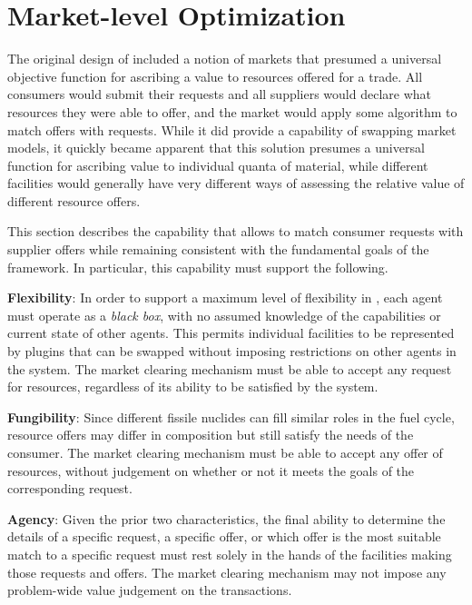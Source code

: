\section{Market-level Optimization}\label{section:market}

The original design of \Cyclus included a notion of markets that presumed a
universal objective function for ascribing a value to resources offered for a
trade.  All consumers would submit their requests and all suppliers would
declare what resources they were able to offer, and the market would apply
some algorithm to match offers with requests.  While it did provide a
capability of swapping market models, it quickly became apparent that this
solution presumes a universal function for ascribing value to individual
quanta of material, while different facilities would generally have very
different ways of assessing the relative value of different resource offers.

This section describes the capability that allows \Cyclus to match consumer
requests with supplier offers while remaining consistent with the fundamental
goals of the \Cyclus framework.  In particular, this capability must support
the following.

\vspace{1em}
\noindent\textbf{Flexibility}: In order to support a maximum level of
flexibility in \Cyclus, each agent must operate as a \textit{black box}, with
no assumed knowledge of the capabilities or current state of other agents.
This permits individual facilities to be represented by plugins that can be
swapped without imposing restrictions on other agents in the system.  The
market clearing mechanism must be able to accept any request for resources,
regardless of its ability to be satisfied by the system.

\vspace{1em}
\noindent\textbf{Fungibility}: Since different fissile nuclides can fill
similar roles in the fuel cycle, resource offers may differ in composition but
still satisfy the needs of the consumer.  The market clearing mechanism must
be able to accept any offer of resources, without judgement on whether or not
it meets the goals of the corresponding request.

\vspace{1em}
\noindent\textbf{Agency}: Given the prior two characteristics, the final
ability to determine the details of a specific request, a specific offer, or
which offer is the most suitable match to a specific request must rest solely
in the hands of the facilities making those requests and offers.  The market
clearing mechanism may not impose any problem-wide value judgement on the
transactions.
\vspace{1em}

